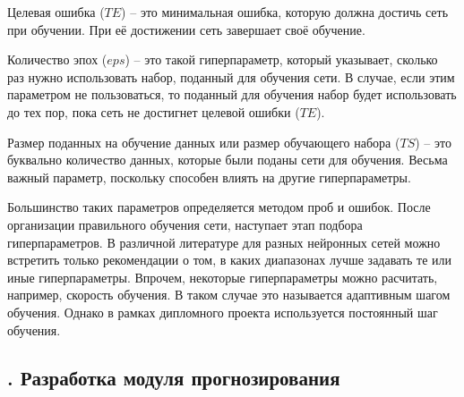 {  \par \redline Целевая ошибка ($TE$) {--} это минимальная ошибка, которую должна достичь сеть при обучении. При её достижении сеть завершает своё обучение.

  \par \redline Количество эпох ($eps$) {--} это такой гиперпараметр, который указывает, сколько раз нужно использовать набор, поданный для обучения сети. В случае, если этим параметром не пользоваться, то поданный для обучения набор будет использовать до тех пор, пока сеть не достигнет целевой ошибки ($TE$).

  \par \redline Размер поданных на обучение данных или размер обучающего набора ($TS$) {--} это буквально количество данных, которые были поданы сети для обучения. Весьма важный параметр, поскольку способен влиять на другие гиперпараметры. 

  \par \redline Большинство таких параметров определяется методом проб и ошибок. После организации правильного обучения сети, наступает этап подбора гиперпараметров. В различной литературе для разных нейронных сетей можно встретить только рекомендации о том, в каких диапазонах лучше задавать те или иные гиперпараметры. Впрочем, некоторые гиперпараметры можно расчитать, например, скорость обучения. В таком случае это называется адаптивным шагом обучения. Однако в рамках дипломного проекта используется постоянный шаг обучения. 

  \par 
}

\subtitlespace

\subsection*{ 
  \gostTitleFont
  \redline
  \thechaptercntr .\thesubchaptercntr \spc 
  Разработка модуля прогнозирования
} \addtocounter{subchaptercntr}{1} 
  
\subtitlespace
  
